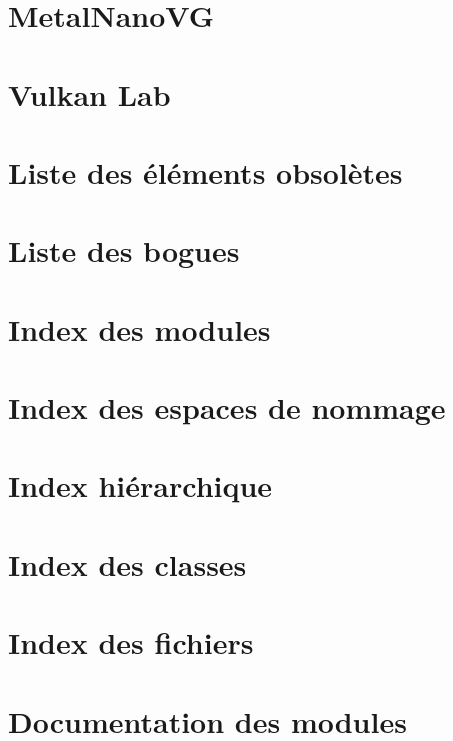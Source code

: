 \let\mypdfximage\pdfximage\def\pdfximage{\immediate\mypdfximage}\documentclass[twoside]{book}
\newcommand{\+}{\discretionary{\mbox{\scriptsize$\hookleftarrow$}}{}{}}
\begin{document}
\chapter{Metal\+Nano\+VG}
\label{md_ext_nanogui_ext_nanovg_metal_README}

\chapter{Vulkan Lab}
\label{md_README}

\chapter{Liste des éléments obsolètes}
\label{deprecated}

\chapter{Liste des bogues}
\label{bug}

\chapter{Index des modules}

\chapter{Index des espaces de nommage}

\chapter{Index hiérarchique}

\chapter{Index des classes}

\chapter{Index des fichiers}

\chapter{Documentation des modules}



















\end{document}

